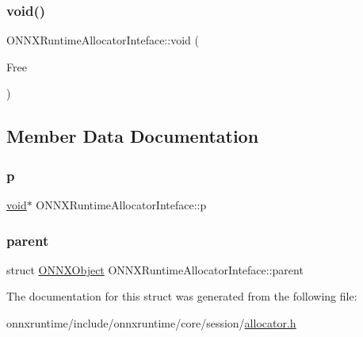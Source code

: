 \mbox{\label{structONNXRuntimeAllocatorInteface_a54eabf966f0201ca7ad1be93fcf5f133}} 
\subsubsection{\texorpdfstring{void()}{void()}}
{\footnotesize\ttfamily O\+N\+N\+X\+Runtime\+Allocator\+Inteface\+::void (\begin{DoxyParamCaption}\item[{\mbox{\hyperlink{error__code_8h_aeaeecdc9b792735c3e26fc0f9815c988}{O\+N\+N\+X\+R\+U\+N\+T\+I\+M\+E\+\_\+\+A\+P\+I\+\_\+\+S\+T\+A\+T\+U\+S\+C\+A\+LL}} $\ast$}]{Free }\end{DoxyParamCaption})}



\subsection{Member Data Documentation}
\mbox{\label{structONNXRuntimeAllocatorInteface_a89e0d3beadbc69c26d69988290dabb67}} 
\subsubsection{\texorpdfstring{p}{p}}
{\footnotesize\ttfamily \mbox{\hyperlink{structONNXRuntimeAllocatorInteface_a54eabf966f0201ca7ad1be93fcf5f133}{void}}$\ast$ O\+N\+N\+X\+Runtime\+Allocator\+Inteface\+::p}

\mbox{\label{structONNXRuntimeAllocatorInteface_abff01465e68ebe03e480dd1d48f42d84}} 
\subsubsection{\texorpdfstring{parent}{parent}}
{\footnotesize\ttfamily struct \mbox{\hyperlink{structONNXObject}{O\+N\+N\+X\+Object}} O\+N\+N\+X\+Runtime\+Allocator\+Inteface\+::parent}



The documentation for this struct was generated from the following file\+:\begin{DoxyCompactItemize}
\item 
onnxruntime/include/onnxruntime/core/session/\mbox{\hyperlink{session_2allocator_8h}{allocator.\+h}}\end{DoxyCompactItemize}
